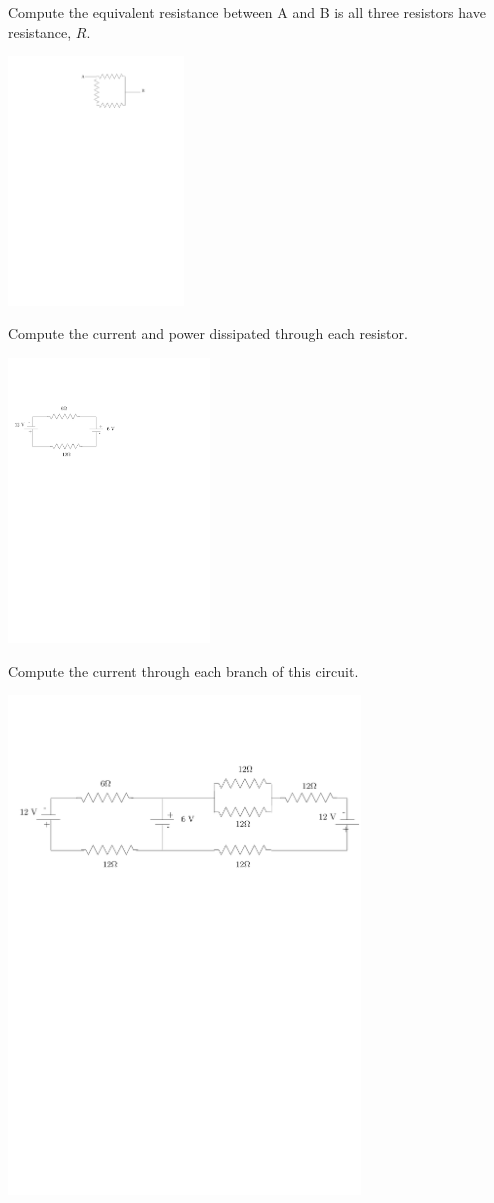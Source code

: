 \documentclass[12pt]{article}
\begin{document}
\pagestyle{empty}


\noindent Compute the equivalent resistance between A and B is all three resistors have resistance, $R$.

\includegraphics[width=0.35\textwidth]{resistor_series.pdf}

\newpage

\noindent Compute the current and power dissipated through each resistor.  

\includegraphics[width=0.4\textwidth]{kirchoff1.pdf}

\newpage 

\noindent Compute the current through each branch of this circuit.  

\includegraphics[width=0.7\textwidth]{kirchoff2.pdf}
\end{document}
